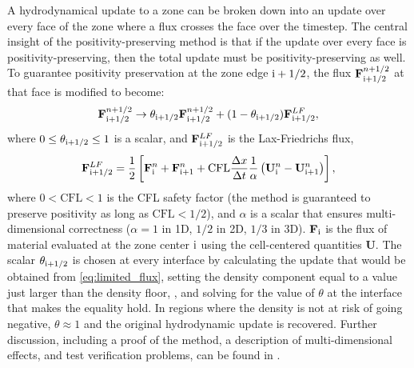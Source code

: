 A hydrodynamical update to a zone can be broken down into an update
over every face of the zone where a flux crosses the face over the
timestep.  The central insight of the positivity-preserving method is
that if the update over every face is positivity-preserving, then the
total update must be positivity-preserving as well.  To guarantee
positivity preservation at the zone edge ${\rm i}+1/2$, the flux
$\mathbf{F}^{n+1/2}_{{\rm i}+1/2}$ at that face is modified to become:
\begin{equation}
  \mathbf{F}^{n+1/2}_{{\rm i}+1/2} \rightarrow \theta_{{\rm i}+1/2} \mathbf{F}^{n+1/2}_{{\rm i}+1/2} + (1 - \theta_{{\rm i}+1/2}) \mathbf{F}^{LF}_{{\rm i}+1/2}, \label{eq:limited_flux}
\end{equation}
where $0 \leq \theta_{{\rm i}+1/2} \leq 1$ is a scalar, and $\mathbf{F}^{LF}_{{\rm i}+1/2}$ is the Lax-Friedrichs flux,
\begin{equation}
  \mathbf{F}^{LF}_{{\rm i}+1/2} = \frac{1}{2}\left[\mathbf{F}^{n}_{{\rm i}} + \mathbf{F}^{n}_{{\rm i}+1} + \text{CFL}\frac{\Delta x}{\Delta t} \frac{1}{\alpha}\left(\mathbf{U}^{n}_{{\rm i}} - \mathbf{U}^{n}_{{\rm i}+1}\right)\right],
\end{equation}
where $0 < \text{CFL} < 1$ is the CFL safety factor (the method is
guaranteed to preserve positivity as long as $\text{CFL} < 1/2$), and
$\alpha$ is a scalar that ensures multi-dimensional correctness
($\alpha = 1$ in 1D, $1/2$ in 2D, $1/3$ in 3D).  $\mathbf{F}_{{\rm
    i}}$ is the flux of material evaluated at the zone center ${\rm
  i}$ using the cell-centered quantities $\mathbf{U}$. The scalar
$\theta_{{\rm i}+1/2}$ is chosen at every interface by calculating the
update that would be obtained from \autoref{eq:limited_flux}, setting
the density component equal to a value just larger than the density floor,
, and solving
for the value of $\theta$ at the interface that makes the equality
hold. In regions where the density is not at risk of going negative,
$\theta \approx 1$ and the original hydrodynamic update is recovered.
Further discussion, including a proof of the method, a description of
multi-dimensional effects, and test verification problems, can be
found in \cite{hu:2013}.
